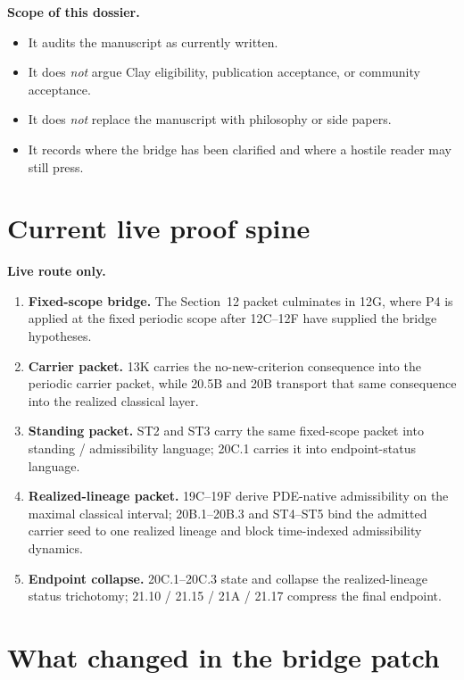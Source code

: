 \documentclass[11pt,letterpaper]{article}
\begin{document}
\begin{scopebox}
\textbf{Scope of this dossier.}
\begin{itemize}
\item It audits the manuscript as currently written.
\item It does \emph{not} argue Clay eligibility, publication acceptance, or community acceptance.
\item It does \emph{not} replace the manuscript with philosophy or side papers.
\item It records where the bridge has been clarified and where a hostile reader may still press.
\end{itemize}
\end{scopebox}

\tableofcontents
\newpage

\section{Current live proof spine}

\begin{spinebox}
\textbf{Live route only.}
\begin{enumerate}[label=(S\arabic*),leftmargin=2.5em]
\item \textbf{Fixed-scope bridge.} The Section~12 packet culminates in 12G, where P4 is applied at the fixed periodic scope after 12C--12F have supplied the bridge hypotheses.
\item \textbf{Carrier packet.} 13K carries the no-new-criterion consequence into the periodic carrier packet, while 20.5B and 20B transport that same consequence into the realized classical layer.
\item \textbf{Standing packet.} ST2 and ST3 carry the same fixed-scope packet into standing / admissibility language; 20C.1 carries it into endpoint-status language.
\item \textbf{Realized-lineage packet.} 19C--19F derive PDE-native admissibility on the maximal classical interval; 20B.1--20B.3 and ST4--ST5 bind the admitted carrier seed to one realized lineage and block time-indexed admissibility dynamics.
\item \textbf{Endpoint collapse.} 20C.1--20C.3 state and collapse the realized-lineage status trichotomy; 21.10 / 21.15 / 21A / 21.17 compress the final endpoint.
\end{enumerate}
\end{spinebox}

\section{What changed in the bridge patch}
\end{document}

